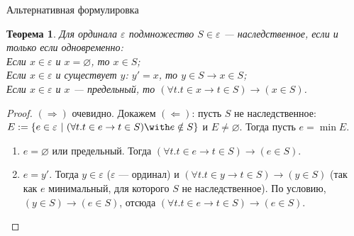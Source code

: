 \documentclass[aspectratio=169]{beamer}
\newtheorem{thm}{Теорема}[section]
\begin{document}
\begin{frame}{Альтернативная формулировка}
\begin{thm}Для ординала $\varepsilon$ подмножество $S \in \varepsilon$ --- наследственное, %
если и только если одновременно:\\
Если $x \in \varepsilon$ и $x = \varnothing$, то $x \in S$;\\
Если $x \in \varepsilon$ и существует $y$: $y' = x$, то $y \in S \rightarrow x \in S$;\\
Если $x \in \varepsilon$ и $x$ --- предельный, то $(\forall t.t \in x \rightarrow t \in S) \rightarrow (x \in S)$.
\end{thm}

\begin{proof}$(\Rightarrow)$ очевидно. \pause Докажем $(\Leftarrow)$: пусть $S$ не наследственное: 
$E := \{e \in \varepsilon \ |\  (\forall t.t \in e \rightarrow t \in S) \with e \notin S \}$
и $E \ne \varnothing$. Тогда пусть $e = \min E$. %

\begin{enumerate}
\item $e = \varnothing$ или предельный. Тогда $(\forall t.t \in e \rightarrow t \in S) \rightarrow (e \in S)$.
\item $e = y'$. Тогда $y \in \varepsilon$ ($\varepsilon$ --- ординал) и 
$(\forall t.t \in y \rightarrow t \in S) \rightarrow (y \in S)$ (так как $e$ минимальный, для которого $S$ не наследственное). \pause
По условию, $(y \in S) \rightarrow (e \in S)$, отсюда $(\forall t.t \in e \rightarrow t \in S) \rightarrow (e \in S)$.

\begin{center}\end{center}

\end{enumerate}\vspace{-0.3cm}
\end{proof}

\end{frame}
\end{document}
